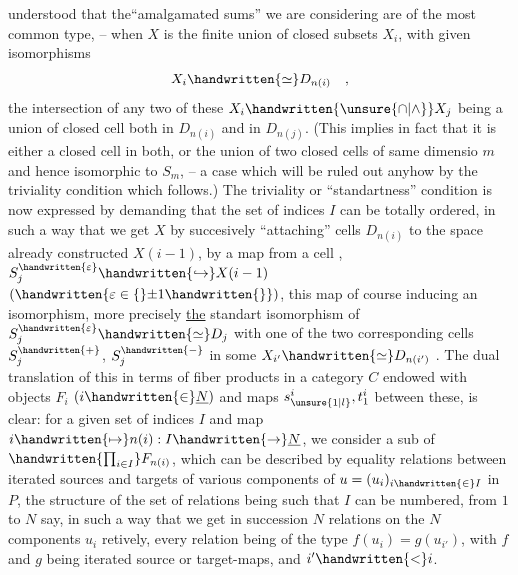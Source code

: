 
understood that the``amalgamated sums'' we are considering are of the most common type, -- when $X$ is the finite union of closed subsets $X_i$, with given isomorphisms
\[
X_i \handwritten{\simeq} D_{n(i)}\quad ,
\]
the intersection of any two of these $X_i \handwritten{\unsure{\cap|\wedge}} X_j$ being a union of closed cell both in $D_{n(i)}$ and in $D_{n(j)}$. (This implies in fact that it is either a closed cell in both, or the union of two closed cells of same dimensio $m$ and hence isomorphic to $S_m$, -- a case which will be ruled out anyhow by the triviality condition which follows.) The triviality or ``standartness'' condition is now expressed by demanding that the set of indices $I$ can be totally ordered, in such a way that we get $X$ by succesively ``attaching'' cells $D_{n(i)}$  to the space already constructed\deleted{\unsure{,}} $X(i-1)$, by a map from a cell , $S_j^{\handwritten{\varepsilon}}\handwritten{\hookrightarrow}X(i-1)$ $(\handwritten{\varepsilon\in\{}\mathord{\pm}1\handwritten{\}})$, this map of course inducing an isomorphism, more precisely \uline{the} standart isomorphism of $S_j^{\handwritten{\varepsilon}}\handwritten{\simeq} D_j$ with one of the two corresponding cells $S_j^{\handwritten{+}}$, $S_j^{\handwritten{-}}$ in some $X_{i'}\handwritten{\simeq}D_{n(i')}$ . The  dual translation of this in terms of fiber products in  a category $C$ endowed with objects $F_i$ $(i\handwritten{\in}\underline{N})$ and maps $s^i_{\unsure{1|l}},t^i_1$ between these, is clear: for a given set of indices $I$ and map $i\handwritten{\mapsto}n(i):I\handwritten{\to}\underline{N}$, we consider a sub of $\handwritten{\prod_{i\in I}}F_{n(i)}$, which can be described by equality relations between iterated sources and targets  of various components of $u=(u_i)_{i\handwritten{\in}I}$ in $P$, the structure of the set of relations being such that $I$ can be numbered, from $1$ to $N$ say, in such a way that we get in succession $N$ relations on the $N$ components $u_i$  retively, every relation being of the type $f(u_i)=g(u_{i'})$, with $f$ and $g$ being iterated source or target-maps, and $i'\handwritten{<}i$. 

